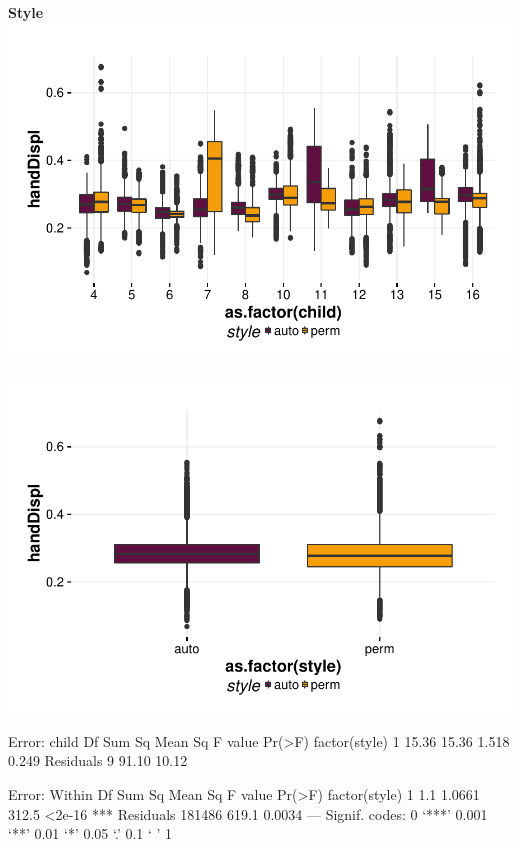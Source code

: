 \documentclass{article}
\begin{document}
\textbf{Style}
\includegraphics{features-plot_handdisplacement_child_style_quiz}

\includegraphics{features-plot_handdisplacement_style_quiz}

\begin{Schunk}
\begin{Soutput}
Error: child
              Df Sum Sq Mean Sq F value Pr(>F)
factor(style)  1  15.36   15.36   1.518  0.249
Residuals      9  91.10   10.12               

Error: Within
                  Df Sum Sq Mean Sq F value Pr(>F)    
factor(style)      1    1.1  1.0661   312.5 <2e-16 ***
Residuals     181486  619.1  0.0034                   
---
Signif. codes:  0 ‘***’ 0.001 ‘**’ 0.01 ‘*’ 0.05 ‘.’ 0.1 ‘ ’ 1
\end{Soutput}
\end{Schunk}
\end{document}
